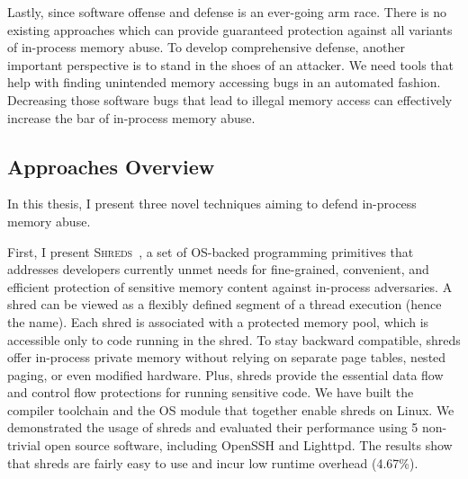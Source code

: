 Lastly, since software offense and defense is an ever-going arm race. There is no existing approaches which can provide guaranteed protection against all variants of in-process memory abuse. To develop comprehensive defense, another important perspective is to stand in the shoes of an attacker. We need tools that help with finding unintended memory accessing bugs in an automated fashion. Decreasing those software bugs that lead to illegal memory access can effectively increase the bar of in-process memory abuse.

\subsection{Approaches Overview}
In this thesis, 
I present three novel techniques aiming to defend in-process memory abuse. 

First, I present \textsc {Shreds}~\cite{shreds}, a set of OS-backed programming primitives that addresses developers currently unmet needs for fine-grained, convenient, and efficient protection of sensitive memory content against in-process adversaries. A shred can be viewed as a flexibly defined segment of a thread execution (hence the name). Each shred is associated with a protected memory pool, which is accessible only to code running in the shred. To stay backward compatible, shreds offer in-process private memory without relying on separate page tables, nested paging, or even modified hardware. Plus, shreds provide the essential data flow and control flow protections for running sensitive code. We have built the compiler toolchain and the OS module that together enable shreds on Linux. We demonstrated the usage of shreds and evaluated their performance using 5 non-trivial open source software, including OpenSSH and Lighttpd. The results show that shreds are fairly easy to use and incur low runtime overhead (4.67\%).

